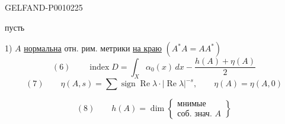 \begin{GelfandAdjacentEvidence}{GELFAND-P001022}{5}


пусть

1) $A$ \underline{нормальна} отн. рим. метрики \underline{на краю}
\qquad $(A^*A=AA^*)$
\[
(6)\qquad \operatorname{index}D=\int_X\alpha_0(x)\,dx
-\frac{h(A)+\eta(A)}2
\]
\[
(7)\qquad \eta(A,s)=\sum\operatorname{sign}\operatorname{Re}\lambda\cdot
|\operatorname{Re}\lambda|^{-s},\qquad \eta(A)=\eta(A,0)
\]
\end{GelfandAdjacentEvidence}

\[
(8)\qquad h(A)=\dim\left\{\begin{gathered}
\text{мнимые}\\\text{соб. знач. }A
\end{gathered}\right\}
\]


